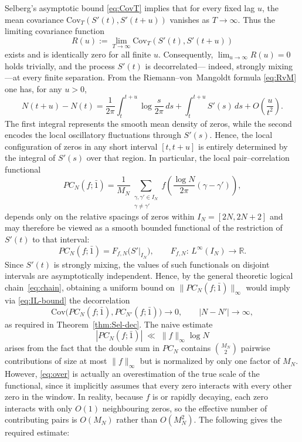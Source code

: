 \documentclass[12pt,reqno]{amsart}
\theoremstyle{plain}
\theoremstyle{definition}
\theoremstyle{remark}
\begin{document}
Selberg's asymptotic bound \eqref{eq:CovT}
implies that for every fixed lag \(u\), the mean covariance
\(\mathrm{Cov}_T(S'(t),S'(t+u))\) vanishes as \(T\to\infty\).
Thus the limiting covariance function
\begin{equation}
R(u):=\lim_{T\to\infty}\mathrm{Cov}_T(S'(t),S'(t+u))
\end{equation}
exists and is identically zero for all finite \(u\).
Consequently, 
\(\lim_{u\to\infty}R(u)=0\)
holds trivially, and the process \(S'(t)\) is decorrelated—
indeed, strongly mixing—at every finite separation. From the Riemann--von~Mangoldt formula \eqref{eq:RvM} one has, for any $u>0$,
\begin{equation}
N(t+u)-N(t)
=\frac{1}{2\pi}\!\int_t^{t+u}\!\log\!\frac{s}{2\pi}\,ds
+\!\int_t^{t+u}\!S'(s)\,ds
+O\!\left(\frac{u}{t^2}\right).
\end{equation}
The first integral represents the smooth mean density of zeros, 
while the second encodes the local oscillatory fluctuations through \(S'(s)\).
Hence, the local configuration of zeros in any short interval $[t,t+u]$
is entirely determined by the integral of \(S'(s)\) over that region. In particular, the local pair--correlation functional
\begin{equation}
PC_N(f;\bar1)
=\frac{1}{M_N}\!\!\sum_{\substack{\gamma,\gamma'\in I_N\\ \gamma\ne\gamma'}}
f\!\left(\frac{\log N}{2\pi}(\gamma-\gamma')\right),
\end{equation}
depends only on the relative spacings of zeros within $I_N=[2N,2N+2]$
and may therefore be viewed as a smooth bounded functional
of the restriction of \(S'(t)\) to that interval:
\begin{equation}
\label{eq:Ffunctional}
PC_N(f;\bar1)=F_{f,N}\bigl(S'|_{I_N}\bigr),
\qquad F_{f,N}:\,L^\infty(I_N)\to\mathbb{R}.
\end{equation}
Since \(S'(t)\) is strongly mixing, 
the values of such functionals on disjoint intervals are asymptotically independent.
Hence, by the general theoretic logical chain~\eqref{eq:chain}, obtaining a uniform bound on $
\|PC_N(f;\bar{1})\|_\infty$ would imply via \eqref{eq:IL-bound} the decorrelation 
\begin{equation}
\mathrm{Cov}\bigl(PC_N(f;\bar1),PC_{N'}(f;\bar1)\bigr)\to0,
\qquad |N-N'|\to\infty,
\end{equation}
as required in Theorem~\ref{thm:Sel-dec}.  
The naive estimate
\begin{equation}
\label{eq:over}
|PC_N(f;\bar{1})| \;\ll\; \|f\|_\infty \log N
\end{equation}
arises from the fact that the double sum in $PC_N$ contains 
$\binom{M_N}{2}$ pairwise contributions of size at most $\|f\|_\infty$ but is normalized by only one factor of $M_N$. However, \eqref{eq:over} is actually an overestimation of the true scale of the functional, since it implicitly assumes that every zero interacts with every other zero in the window.  
In reality, because $f$ is or rapidly decaying, 
each zero interacts with only $O(1)$ neighbouring zeros, 
so the effective number of contributing pairs is $O(M_N)$ rather than $O(M_N^2)$.  The following gives the required estimate:
\end{document}
